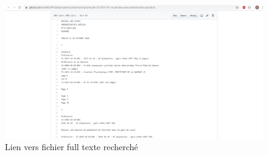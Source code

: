 \begin{figure}[h!]
  \includegraphics[width=\linewidth]{images/annexeLienVersRecherche.PNG}
	\caption{Lien vers fichier full texte recherché}
	\label{}
\end{figure}

\newpage
\mbox{~}
